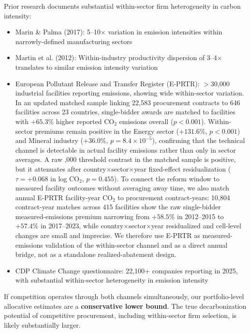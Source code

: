 \documentclass[11pt]{article}
\begin{document}
Prior research documents substantial within-sector firm heterogeneity in carbon intensity:
\begin{itemize}
\item Marin \& Palma (2017): 5--10$\times$ variation in emission intensities within narrowly-defined manufacturing sectors
\item Martin et al. (2012): Within-industry productivity dispersion of 3--4$\times$ translates to similar emission intensity variation
\item European Pollutant Release and Transfer Register (E-PRTR): $>$30,000 industrial facilities reporting emissions, showing wide within-sector variation. In an updated matched sample linking 22,583 procurement contracts to 646 facilities across 23 countries, single-bidder awards are matched to facilities with $+65.3\%$ higher reported CO$_2$ emissions overall ($p < 0.001$). Within-sector premiums remain positive in the Energy sector ($+131.6\%$, $p < 0.001$) and Mineral industry ($+36.0\%$, $p = 8.4 \times 10^{-5}$), confirming that the technical channel is detectable in actual facility emissions rather than only in sector averages. A raw ,000 threshold contrast in the matched sample is positive, but it attenuates after country$\times$sector$\times$year fixed-effect residualization ($\tau = +0.068$ in log CO$_2$, $p = 0.455$). To connect the reform window to measured facility outcomes without averaging away time, we also match annual E-PRTR facility-year CO$_2$ to procurement contract-years: 10,804 contract-year matches across 415 facilities show the raw single-bidder measured-emissions premium narrowing from $+58.5\%$ in 2012--2015 to $+57.4\%$ in 2017--2023, while country$\times$sector$\times$year residualized and cell-level changes are small and imprecise. We therefore use E-PRTR as measured-emissions validation of the within-sector channel and as a direct annual bridge, not as a standalone realized-abatement design.
\item CDP Climate Change questionnaire: 22,100+ companies reporting in 2025, with substantial within-sector heterogeneity in emission intensity
\end{itemize}

If competition operates through both channels simultaneously, our portfolio-level allocative estimates are a \textbf{conservative lower bound}. The true decarbonization potential of competitive procurement, including within-sector firm selection, is likely substantially larger.

\end{document}
